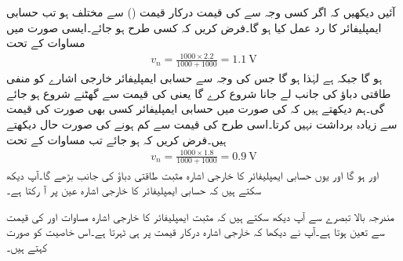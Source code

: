 آئیں دیکھیں کہ اگر کسی وجہ سے  کی قیمت درکار قیمت () سے مختلف ہو تب حسابی ایمپلیفائر کا رد عمل کیا ہو گا۔فرض کریں  کہ کسی طرح  ہو جائے۔ایسی صورت میں مساوات  کے تحت
\begin{align*}
v_n=\frac{1000 \times 2.2}{1000+1000}=\SI{1.1}{\volt}
\end{align*}
ہو گا جبکہ  ہے لہٰذا  ہو گا جس کی وجہ سے حسابی ایمپلیفائر خارجی اشارے کو منفی طاقتی دباؤ کی جانب لے جانا شروع کرے گا یعنی  کی قیمت  سے گھٹنے شروع ہو جائے گی۔ہم دیکھتے ہیں کہ   کی صورت میں حسابی ایمپلیفائر کسی بھی صورت  کی قیمت  سے زیادہ برداشت نہیں کرتا۔اسی طرح   کی قیمت  سے کم ہونے کی صورت حال دیکھتے ہیں۔فرض کریں کہ  ہو جائے تب مساوات   کے تحت
\begin{align*}
v_n=\frac{1000 \times 1.8}{1000+1000}=\SI{0.9}{\volt}
\end{align*}
 اور  ہو گا اور یوں حسابی ایمپلیفائر کا خارجی اشارہ   مثبت طاقتی دباؤ کی جانب بڑھے گا۔آپ دیکھ سکتے ہیں کہ حسابی ایمپلیفائر کا خارجی اشارہ عین  پر آ رکتا ہے۔

مندرجہ بالا تبصرے سے آپ دیکھ سکتے ہیں کہ مثبت ایمپلیفائر کا خارجی اشارہ مساوات  اور  کی قیمت سے تعین ہوتا ہے۔آپ نے دیکھا کہ خارجی اشارہ درکار قیمت پر ہی ٹہرتا ہے۔اس خاصیت کو  صورت کہتے ہیں۔ 

